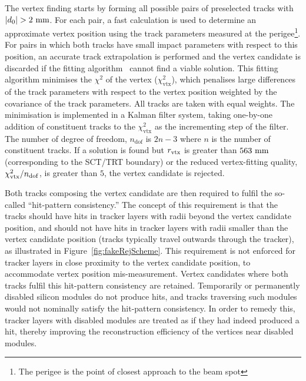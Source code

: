 \documentclass[PUB,UKenglish, texlive=2018]{\ATLASLATEXPATH atlasdoc}
\begin{document}
The vertex finding starts by forming all possible pairs of preselected tracks with $|d_{0}|>2~{\rm mm}$. 
For each pair, a fast calculation is used to determine an approximate vertex position using the track parameters measured at the perigee\footnote{The perigee is the point of closest approach to the beam spot}. 
For pairs in which both tracks have small impact parameters with respect to this position, an accurate track extrapolation is performed
and the vertex candidate is discarded if the fitting algorithm~\cite{Kostyukhin:2003daa} cannot find a viable solution. 
This fitting algorithm minimises the $\chi^{2}$ of the vertex ($\chi^{2}_{\mathrm{vtx}}$), which penalises large differences of the track parameters with respect to the vertex position weighted by the covariance of the track parameters.
All tracks are taken with equal weights.
The minimisation is implemented in a Kalman filter system, taking one-by-one addition of constituent tracks to the $\chi^{2}_{\mathrm{vtx}}$ as the incrementing step of the filter. 
The number of degree of freedom, $n_{\mathrm{dof}}$ is $2n-3$ where $n$ is the number of constituent tracks. 
If a solution is found but $r_{\rm vtx}$ is greater than $563~{\rm mm}$ (corresponding to the SCT/TRT boundary) or the reduced vertex-fitting quality, $\chi^{2}_{\rm vtx}/n_{\rm dof}$, is greater than $5$, the vertex candidate is rejected.

Both tracks composing the vertex candidate are then required to fulfil the so-called ``hit-pattern consistency.''  %
The concept of this requirement is that the tracks should have hits in tracker layers with radii beyond the vertex candidate position, and should not have hits in tracker layers with radii smaller than the vertex candidate position %
(tracks typically travel outwards through the tracker), as illustrated in Figure~\ref{fig:fakeRejScheme}. 
This requirement is not enforced for tracker layers in close proximity to the vertex candidate position, to accommodate vertex position mis-measurement.  %
Vertex candidates where both tracks fulfil this hit-pattern consistency are retained. 
Temporarily or permanently disabled silicon modules do not produce hits, and tracks traversing such modules would not nominally satisfy the hit-pattern consistency. 
In order to remedy this, %
tracker layers with disabled modules are treated as if they had indeed produced a hit, thereby improving the reconstruction efficiency of the vertices near disabled modules. 
\end{document}
